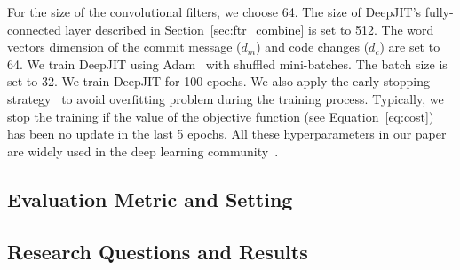 


For the size of the convolutional filters, we choose 64. The size of DeepJIT's fully-connected layer described in Section~\ref{sec:ftr_combine} is set to 512. The word vectors dimension of the commit message ($d_m$) and code changes ($d_c$) are set to 64. We train DeepJIT using Adam~\cite{kingma2014adam} with shuffled mini-batches.  The batch size is set to 32. We train DeepJIT for 100 epochs. We also apply the early stopping strategy~\cite{prechelt1998automatic, caruana2001overfitting} to avoid overfitting problem during the training process. Typically, we stop the training if the value of the objective function (see Equation~\ref{eq:cost}) has been no update in the last 5 epochs. All these hyperparameters in our paper are widely used in the deep learning community~\cite{severyn2015learning, huo2016learning, huo2017enhancing, hinton2012improving}. 
 

\subsection{Evaluation Metric and Setting}
\label{sec:metric_setting}

\subsection{Research Questions and Results}
\label{sec:rq_results}

